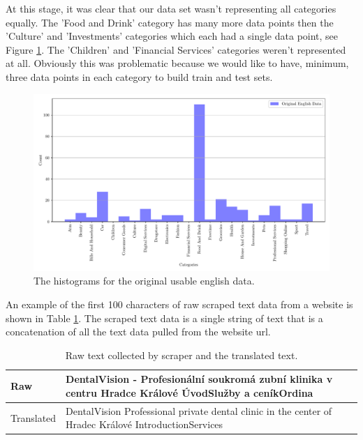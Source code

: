 At this stage, it was clear that our data set wasn't representing all categories equally. The 'Food and Drink' category has many more data points then the 'Culture' and 'Investments' categories which each had a single data point, see Figure \ref{fig:original_english_counts}. The 'Children' and 'Financial Services' categories weren't represented at all. Obviously this was problematic because we would like to have, minimum, three data points in each category to build train and test sets.

\begin{figure}[!ht]
  \centering
  \includegraphics[width=\textwidth]{../img/plot_original_english_counts.pdf}
  \caption{The histograms for the original usable english data.}
  \label{fig:original_english_counts}
\end{figure}

An example of the first 100 characters of raw scraped text data from a website is shown in Table \ref{tab:text_examples}. The scraped text data is a single string of text that is a concatenation of all the text data pulled from the website url. 

\begin{table}[!ht]
\centering
\caption{Raw text collected by scraper and the translated text.}
\begin{tabular}{|l|p{10cm}|}
\hline
Raw & DentalVision - Profesionální soukromá zubní klinika v centru Hradce Králové ÚvodSlužby a ceníkOrdina \\ \hline
Translated & DentalVision Professional private dental clinic in the center of Hradec Králové IntroductionServices \\ \hline
\end{tabular}
\label{tab:text_examples}
\end{table}

